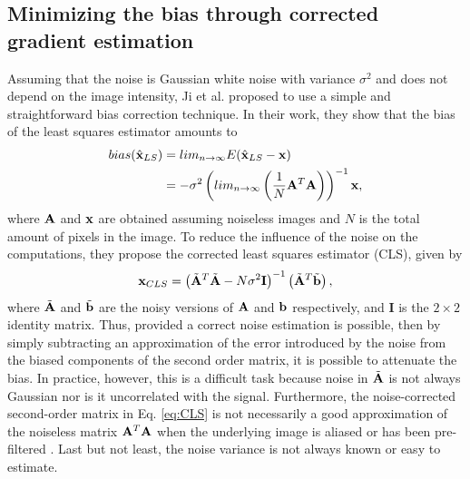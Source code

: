 \subsection{Minimizing the bias through corrected gradient estimation}
\label{subsubsec:minimizeBias}
Assuming that the noise is Gaussian white noise with variance $\sigma^2$ and does not depend on the image intensity, Ji et al. \cite{Ji2006} proposed to use a simple and straightforward bias correction technique. In their work, they show that the bias of the least squares estimator amounts to
\begin{align}
\nonumber bias(\hat{\mathbf{x}}_{LS}) &= lim_{n \rightarrow \infty} E(\hat{\mathbf{x}}_{LS} - \mathbf{x}) \\
&= -\sigma^2 \left( lim_{n \rightarrow \infty} \left( \frac{1}{N} \mathbf{A}^T \mathbf{A}\right)\right)^{-1} \mathbf{x},
\end{align}
where $\mathbf{A}$ and $\mathbf{x}$ are obtained assuming noiseless images and $N$ is the total amount of pixels in the image. To reduce the influence of the noise on the computations, they propose the corrected least squares estimator (CLS), given by
\begin{equation}
\mathbf{x}_{CLS} = \left(\tilde{\mathbf{A}}^T\tilde{\mathbf{A}} - N\sigma^2\mathbf{I} \right)^{-1}\left(\tilde{\mathbf{A}}^T \tilde{\mathbf{b}}\right),
\label{eq:CLS}
\end{equation}
where $\tilde{\mathbf{A}}$ and $\tilde{\mathbf{b}}$ are the noisy versions of $\mathbf{A}$ and $\mathbf{b}$ respectively, and $\mathbf{I}$ is the $2\times 2$ identity matrix. Thus, provided a correct noise estimation is possible, then by simply subtracting an approximation of the error introduced by the noise from the biased components of the second order matrix, it is possible to attenuate the bias. In practice, however, this is a difficult task because noise in $\tilde {\mathbf{A}}$ is not always Gaussian nor is it uncorrelated with the signal. Furthermore, the noise-corrected second-order matrix in Eq. \eqref{eq:CLS} is not necessarily a good approximation of the noiseless matrix $\mathbf{A}^T \mathbf{A}$ when the underlying image is aliased or has been pre-filtered \cite{pham2008}. Last but not least, the noise variance is not always known or easy to estimate.%

